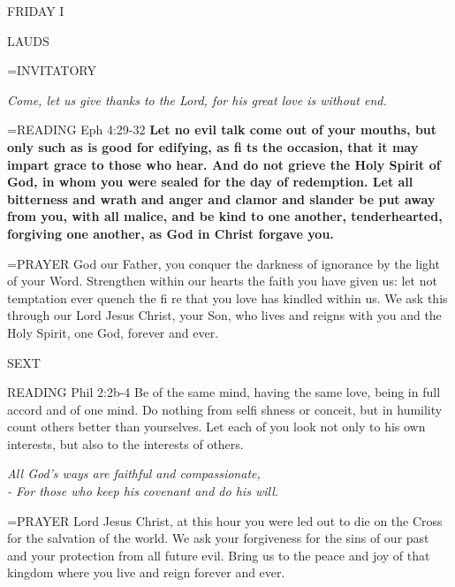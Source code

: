 \begin{center}
\normalsize FRIDAY I
\end{center}

\begin{flushleft}\normalsize LAUDS\\\end{flushleft}
\hangindent=\parindent \small{INVITATORY}
\begin{center}
\textit{Come, let us give thanks to the Lord, for his great love is without end.\\}
\end{center}

\hangindent=\parindent \small{READING} Eph 4:29-32 \textbf{Let no evil talk come out of your mouths, but only such as is good for edifying, as fi ts the occasion, that it may impart grace to those who hear. And do not grieve the Holy Spirit of God, in whom you were sealed for the day of redemption.  Let all bitterness and wrath and anger and clamor and slander be put away from you, with all malice, and be kind to one another, tenderhearted, forgiving one another, as God in Christ forgave you.\\}

\hangindent=\parindent \small{PRAYER  God our Father, you conquer the darkness of ignorance by the light of your Word. Strengthen within our hearts the faith you have given us: let not temptation ever quench the fi re that you love has kindled within us. We ask this through our Lord Jesus Christ, your Son, who lives and reigns with you and the Holy Spirit, one God, forever and ever.}

\begin{flushleft}\normalsize SEXT\\\end{flushleft}

READING Phil 2:2b-4 Be of the same mind, having the same love, being in full accord and of one mind. Do nothing from selfi shness or conceit, but in humility count others better than yourselves. Let each of you look not only to his own interests, but also to the interests of others.

\begin{center}
\textit{All God’s ways are faithful and compassionate,\\
- For those who keep his covenant and do his will.}
\end{center}

\hangindent=\parindent \small{PRAYER  Lord Jesus Christ, at this hour you were led out to die on the Cross for the salvation of the world. We ask your forgiveness for the sins of our past and your protection from all future evil. Bring us to the peace and joy of that kingdom where you live and reign forever and ever.}

